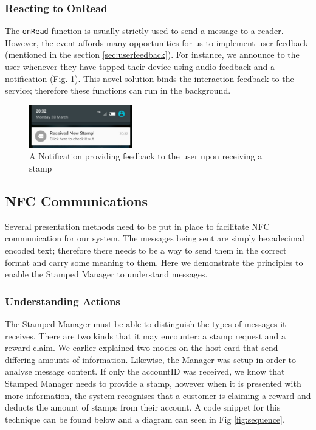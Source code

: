 \subsubsection{Reacting to OnRead}
The \texttt{onRead} function is usually strictly used to send a message to a reader. However, the event affords many opportunities for us to implement user feedback (mentioned in the section \ref{sec:userfeedback}). For instance, we announce to the user whenever they have tapped their device using audio feedback and a notification (Fig. \ref{fig:notification}). This novel solution binds the interaction feedback to the service; therefore these functions can run in the background.

\begin{figure}[H]
 \centering
  \includegraphics[width=0.40\textwidth]{img/notification.jpg}
     \caption{A Notification providing feedback to the user upon receiving a stamp}
     \label{fig:notification}
\end{figure}

\subsection{NFC Communications}
Several presentation methods need to be put in place to facilitate NFC communication for our system. The messages being sent are simply hexadecimal encoded text; therefore there needs to be a way to send them in the correct format and carry some meaning to them. Here we demonstrate the principles to enable the Stamped Manager to understand messages.

\subsubsection{Understanding Actions}
\label{sec:understanding}
The Stamped Manager must be able to distinguish the types of messages it receives. There are two kinds that it may encounter: a stamp request and a reward claim. We earlier explained two modes on the host card that send differing amounts of information. Likewise, the Manager was setup in order to analyse message content. If only the accountID was received, we know that Stamped Manager needs to provide a stamp, however when it is presented with more information, the system recognises that a customer is claiming a reward and deducts the amount of stamps from their account. A code snippet for this technique can be found below and a diagram can seen in Fig \ref{fig:sequence}.

